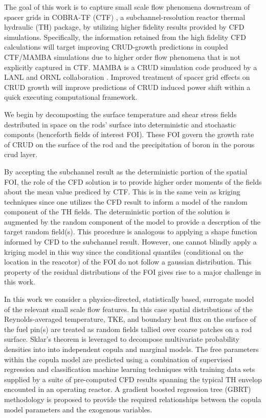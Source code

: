 The goal of this work is to capture small scale flow phenomena downstream of spacer grids
in COBRA-TF (CTF) \cite{salko12}, a subchannel-resolution reactor thermal hydraulic (TH) package, by utilizing higher fidelity results provided by CFD simulations.  Specifically, the information retained from the high fidelity CFD calculations will target
 improving CRUD-growth predictions in coupled CTF/MAMBA
simulations due to higher order flow phenomena that is not explicitly captured in CTF.  MAMBA
is a CRUD simulation code produced by a LANL and ORNL collaboration \cite{collins16}.  Improved treatment of spacer grid effects on CRUD growth will improve predictions of CRUD induced
power shift within a quick executing computational framework.

We begin by decomposting the surface temperature and shear stress fields destributed in space on the rods' surface into deterministic and stochastic componts (henceforth fields of interest FOI).
These FOI govern the growth rate of CRUD on the surface of the rod and the precipitation of boron in the porous crud layer.

By accepting the subchannel result as the deterministic portion of the
spatial FOI, the role of the CFD solution is to provide higher order
moments of the fields about the mean value prediced by CTF.
This is in the same vein as kriging techniques since one utilizes
the CFD result to inform a model of the random component of
the TH fields.  The deterministic portion of the solution is augmented by the
random component of the model to provide a descrption of the target random field(s).
This procedure is analogous to applying a shape function informed by CFD
to the subchannel result.
However, one cannot blindly apply a kriging model in this way since the
conditional quantiles (conditional on the location in the reacotor) of the FOI do not follow a gaussian distribution.
This property of the residual distributions of the FOI gives rise to a major challenge
in this work.

In this work we consider a physics-directed, statistically
based, surrogate model of the relevant small scale flow features.
In this case spatial distributions of the Reynolds-averaged temperature,
TKE, and boundary heat flux on the surface of the fuel pin(s) are treated
as random fields tallied over coarse patches on a rod surface.
Sklar's theorem is leveraged
to decompose multivariate probability densities into into independent copula
and marginal models. The free parameters within the copula model are predicted using a combination of supervised regression and classification machine learning techniques with training
data sets supplied by a suite of pre-computed CFD results spanning the typical TH envelop encounted in an operating reactor. A
gradient boosted regression tree (GBRT) methodology is proposed to provide the
required relationships between the copula model parameters and the
exogenous variables.


